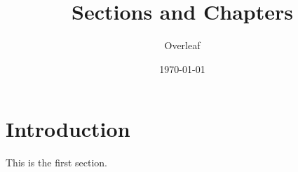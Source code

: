 \documentclass{article}
\title{Sections and Chapters}
\author{Overleaf}
\date{\today}
\begin{document}
\maketitle
\section{Introduction}

This is the first section.
\end{document}
